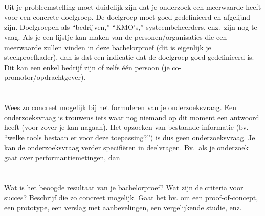 \section{}
\label{sec:probleemstelling}

Uit je probleemstelling moet duidelijk zijn dat je onderzoek een meerwaarde heeft voor een concrete doelgroep. De doelgroep moet goed gedefinieerd en afgelijnd zijn. Doelgroepen als ``bedrijven,'' ``KMO's,'' systeembeheerders, enz.~zijn nog te vaag. Als je een lijstje kan maken van de personen/organisaties die een meerwaarde zullen vinden in deze bachelorproef (dit is eigenlijk je steekproefkader), dan is dat een indicatie dat de doelgroep goed gedefinieerd is. Dit kan een enkel bedrijf zijn of zelfs één persoon (je co-promotor/opdrachtgever).

\section{}
\label{sec:onderzoeksvraag}

Wees zo concreet mogelijk bij het formuleren van je onderzoeksvraag. Een onderzoeksvraag is trouwens iets waar nog niemand op dit moment een antwoord heeft (voor zover je kan nagaan). Het opzoeken van bestaande informatie (bv. ``welke tools bestaan er voor deze toepassing?'') is dus geen onderzoeksvraag. Je kan de onderzoeksvraag verder specifiëren in deelvragen. Bv.~als je onderzoek gaat over performantiemetingen, dan 

\section{}
\label{sec:onderzoeksdoelstelling}

Wat is het beoogde resultaat van je bachelorproef? Wat zijn de criteria voor succes? Beschrijf die zo concreet mogelijk. Gaat het bv. om een proof-of-concept, een prototype, een verslag met aanbevelingen, een vergelijkende studie, enz.

\section{}
\label{sec:opzet-bachelorproef}


